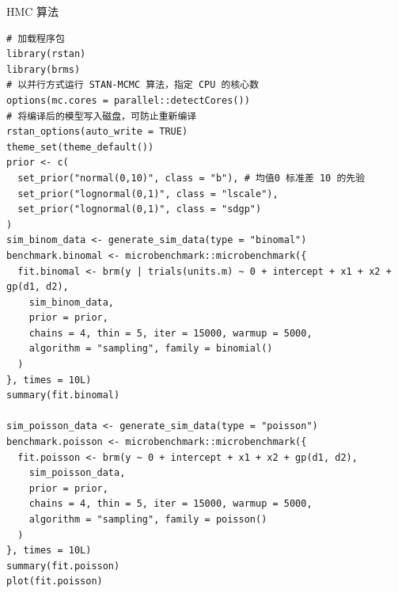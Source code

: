 \documentclass[12pt,a4paper,UTF8,twoside]{book}
\theoremstyle{definition}
\theoremstyle{definition}
\theoremstyle{definition}
\theoremstyle{remark}
\begin{document}
HMC 算法

\begin{verbatim}
# 加载程序包
library(rstan)
library(brms)
# 以并行方式运行 STAN-MCMC 算法，指定 CPU 的核心数
options(mc.cores = parallel::detectCores())
# 将编译后的模型写入磁盘，可防止重新编译
rstan_options(auto_write = TRUE)
theme_set(theme_default())
prior <- c(
  set_prior("normal(0,10)", class = "b"), # 均值0 标准差 10 的先验
  set_prior("lognormal(0,1)", class = "lscale"),
  set_prior("lognormal(0,1)", class = "sdgp")
)
sim_binom_data <- generate_sim_data(type = "binomal")
benchmark.binomal <- microbenchmark::microbenchmark({
  fit.binomal <- brm(y | trials(units.m) ~ 0 + intercept + x1 + x2 + gp(d1, d2),
    sim_binom_data,
    prior = prior,
    chains = 4, thin = 5, iter = 15000, warmup = 5000,
    algorithm = "sampling", family = binomial()
  )
}, times = 10L)
summary(fit.binomal)

sim_poisson_data <- generate_sim_data(type = "poisson")
benchmark.poisson <- microbenchmark::microbenchmark({
  fit.poisson <- brm(y ~ 0 + intercept + x1 + x2 + gp(d1, d2),
    sim_poisson_data,
    prior = prior,
    chains = 4, thin = 5, iter = 15000, warmup = 5000, 
    algorithm = "sampling", family = poisson()
  )
}, times = 10L)
summary(fit.poisson)
plot(fit.poisson)
\end{verbatim}


\backmatter
\end{document}
